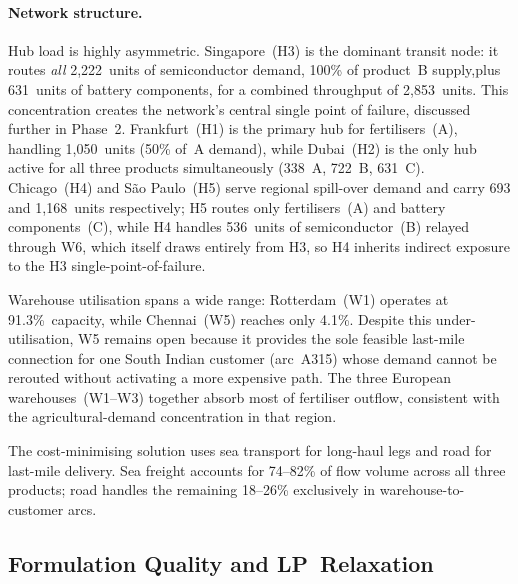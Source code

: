 \paragraph{Network structure.}
Hub load is highly asymmetric.
Singapore~(H3) is the dominant transit node: it routes \emph{all} 2{,}222~units
of semiconductor demand, 100\% of product~B supply,plus 631~units of
battery components, for a combined throughput of 2{,}853~units.
This concentration creates the network's central single point of failure,
discussed further in Phase~2.
Frankfurt~(H1) is the primary hub for fertilisers~(A), handling 1{,}050~units
(50\% of~A demand), while Dubai~(H2) is the only hub active for all three
products simultaneously (338~A, 722~B, 631~C).
Chicago~(H4) and S\~ao Paulo~(H5) serve regional spill-over demand and carry
693 and 1{,}168~units respectively; H5 routes only fertilisers~(A) and battery
components~(C), while H4 handles 536~units of semiconductor~(B) relayed through
W6, which itself draws entirely from H3, so H4 inherits indirect exposure to
the H3 single-point-of-failure.

Warehouse utilisation spans a wide range: Rotterdam~(W1) operates at
91.3\%~capacity, while Chennai~(W5) reaches only 4.1\%.
Despite this under-utilisation, W5 remains open because it provides the sole
feasible last-mile connection for one South Indian customer (arc~A315) whose
demand cannot be rerouted without activating a more expensive path.
The three European warehouses~(W1--W3) together absorb most of fertiliser
outflow, consistent with the agricultural-demand concentration in that region.

The cost-minimising solution  uses sea transport for long-haul legs and road for 
last-mile delivery. 
Sea freight accounts for 74--82\% of flow volume across all three products;
road handles the remaining 18--26\% exclusively in warehouse-to-customer arcs.

\subsection*{Formulation Quality and LP~Relaxation}

